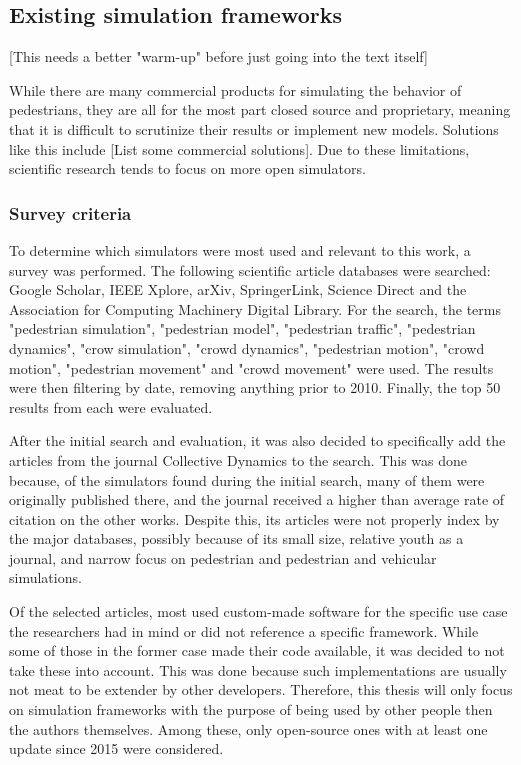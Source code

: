 \documentclass[twoside, 11pt]{article}
\begin{document}
\subsection{Existing simulation frameworks} \label{sec:existing-frameworks}

[This needs a better "warm-up" before just going into the text itself]

While there are many commercial products for simulating the behavior of pedestrians, they are all for the most part closed source and proprietary, meaning that it is difficult to scrutinize their results or implement new models. Solutions like this include [List some commercial solutions]. Due to these limitations, scientific research tends to focus on more open simulators. 

\subsubsection{Survey criteria}

To determine which simulators were most used and relevant to this work, a survey was performed. The following scientific article databases were searched: Google Scholar, IEEE Xplore, arXiv, SpringerLink, Science Direct and the Association for Computing Machinery Digital Library. For the search, the terms "pedestrian simulation", "pedestrian model", "pedestrian traffic", "pedestrian dynamics", "crow simulation", "crowd dynamics", "pedestrian motion", "crowd motion", "pedestrian movement" and "crowd movement" were used.
The results were then filtering by date, removing anything prior to 2010. Finally, the top 50 results from each were evaluated.

After the initial search and evaluation, it was also decided to specifically add the articles from the journal Collective Dynamics to the search. This was done because, of the simulators found during the initial search, many of them were originally published there, and the journal received a higher than average rate of citation on the other works. Despite this, its articles were not properly index by the major databases, possibly because of its small size, relative youth as a journal, and narrow focus on pedestrian and pedestrian and vehicular simulations. 

Of the selected articles, most used custom-made software for the specific use case the researchers had in mind or did not reference a specific framework. While some of those in the former case made their code available, it was decided to not take these into account. This was done because such implementations are usually not meat to be extender by other developers. Therefore, this thesis will only focus on simulation frameworks with the purpose of being used by other people then the authors themselves. Among these, only open-source ones with at least one update since 2015 were considered. 
\end{document}
